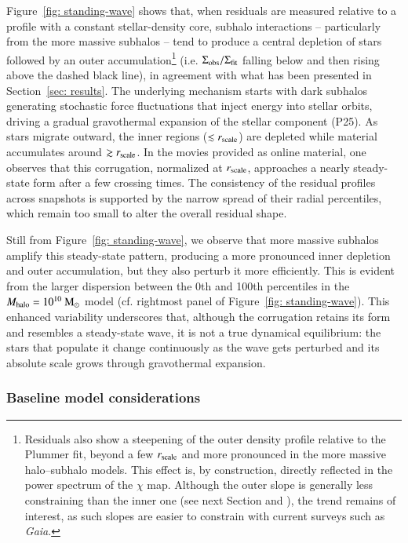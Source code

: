 \documentclass[fleqn,usenatbib]{mnras}
\newcommand{\gaia}{{\sl Gaia}}
\newcommand{\msun}{\rm M_\odot}
\begin{document}
Figure~\ref{fig: standing-wave} shows that, when residuals are measured relative to a profile with a constant stellar-density core, subhalo interactions -- particularly from the more massive subhalos -- tend to produce a central depletion of stars followed by an outer accumulation\footnote{Residuals also show a steepening of the outer density profile relative to the Plummer fit, beyond a few $r_{\rm scale}$ and more pronounced in the more massive halo–subhalo models. This effect is, by construction, directly reflected in the power spectrum of the $\chi$ map. Although the outer slope is generally less constraining than the inner one (see next Section and \citealt{Ciotti&Morganti09}), the trend remains of interest, as such slopes are easier to constrain with current surveys such as \gaia.} (i.e. $\Sigma_{\rm obs} / \Sigma_{\rm fit}$ falling below and then rising above the dashed black line), in agreement with what has been presented in Section~\ref{sec: results}. The underlying mechanism starts with dark subhalos generating stochastic force fluctuations that inject energy into stellar orbits, driving a gradual gravothermal expansion of the stellar component (P25). As stars migrate outward, the inner regions ($\lesssim r_{\rm scale}$) are depleted while material accumulates around $\gtrsim r_{\rm scale}$. In the movies provided as online material, one observes that this corrugation, normalized at $r_{\rm scale}$, approaches a nearly steady-state form after a few crossing times. The consistency of the residual profiles across snapshots is supported by the narrow spread of their radial percentiles, which remain too small to alter the overall residual shape.

Still from Figure~\ref{fig: standing-wave}, we observe that more massive subhalos amplify this steady-state pattern, producing a more pronounced inner depletion and outer accumulation, but they also perturb it more efficiently. This is evident from the larger dispersion between the 0th and 100th percentiles in the $M_{\rm halo} = 10^{10}~\msun$ model (cf. rightmost panel of Figure~\ref{fig: standing-wave}). This enhanced variability underscores that, although the corrugation retains its form and resembles a steady-state wave, it is not a true dynamical equilibrium: the stars that populate it change continuously as the wave gets perturbed and its absolute scale grows through gravothermal expansion.

\subsubsection{Baseline model considerations} \label{sssec: baseline}
\end{document}
